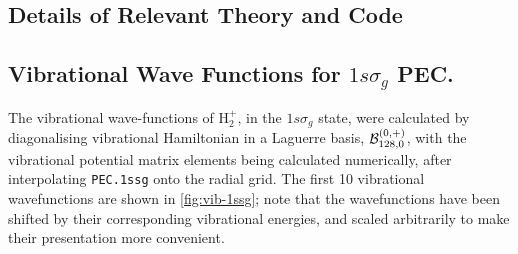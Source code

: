 \documentclass[draft]{article}
\newcommand{\lilf}[1]{\lstinline[style=ff]{#1}}
\begin{document}
\subsection*{Details of Relevant Theory and Code}

\subsection{Vibrational Wave Functions for $1s\sigma_{g}$ PEC.}

The vibrational wave-functions of $\mathrm{H}_{2}^{+}$, in the $1s\sigma_{g}$
state, were calculated by diagonalising vibrational Hamiltonian in a Laguerre
basis, $\mathcal{B}_{128, 0}^{(0, +)}$, with the vibrational potential matrix
elements being calculated numerically, after interpolating \lilf{PEC.1ssg} onto
the radial grid.
The first 10 vibrational wavefunctions are shown in \autoref{fig:vib-1ssg}; note
that the wavefunctions have been shifted by their corresponding vibrational
energies, and scaled arbitrarily to make their presentation more convenient.
\end{document}

